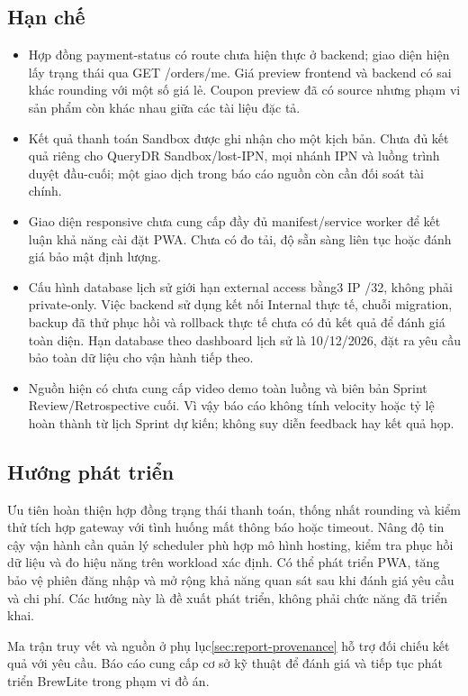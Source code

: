 \subsection{Hạn chế}
\label{sec:limitations}
\begin{itemize}
\item Hợp đồng payment-status có route chưa hiện thực ở backend; giao diện
hiện lấy trạng thái qua GET /orders/me. Giá preview frontend và backend có
sai khác rounding với một số giá lẻ. Coupon preview đã có source nhưng phạm
vi sản phẩm còn khác nhau giữa các tài liệu đặc tả.
\item Kết quả thanh toán Sandbox được ghi nhận cho một kịch bản. Chưa đủ
kết quả riêng cho QueryDR Sandbox/lost-IPN, mọi nhánh IPN và luồng trình duyệt
đầu-cuối; một giao dịch trong báo cáo nguồn còn cần đối soát tài chính.
\item Giao diện responsive chưa cung cấp đầy đủ manifest/service worker
để kết luận khả năng cài đặt PWA. Chưa có đo tải, độ sẵn sàng liên tục hoặc
đánh giá bảo mật định lượng.
\item Cấu hình database lịch sử giới hạn external access bằng3 IP /32,
không phải private-only. Việc backend sử dụng kết nối Internal thực tế,
chuỗi migration, backup đã thử phục hồi và rollback thực tế chưa có đủ
kết quả để đánh giá toàn diện. Hạn database theo dashboard lịch sử là
10/12/2026, đặt ra yêu cầu bảo toàn dữ liệu cho vận hành tiếp theo.
\item Nguồn hiện có chưa cung cấp video demo toàn luồng và biên bản
Sprint Review/Retrospective cuối. Vì vậy báo cáo không tính velocity hoặc
tỷ lệ hoàn thành từ lịch Sprint dự kiến; không suy diễn feedback hay kết quả họp.
\end{itemize}

\subsection{Hướng phát triển}
Ưu tiên hoàn thiện hợp đồng trạng thái thanh toán, thống nhất rounding và
kiểm thử tích hợp gateway với tình huống mất thông báo hoặc timeout. Nâng
độ tin cậy vận hành cần quản lý scheduler phù hợp mô hình hosting, kiểm tra
phục hồi dữ liệu và đo hiệu năng trên workload xác định. Có thể phát triển
PWA, tăng bảo vệ phiên đăng nhập và mở rộng khả năng quan sát sau khi đánh
giá yêu cầu và chi phí. Các hướng này là đề xuất phát triển, không phải
chức năng đã triển khai.

Ma trận truy vết và nguồn ở phụ lục\ref{sec:report-provenance} hỗ trợ đối
chiếu kết quả với yêu cầu. Báo cáo cung cấp cơ sở kỹ thuật để đánh giá và
tiếp tục phát triển BrewLite trong phạm vi đồ án.
